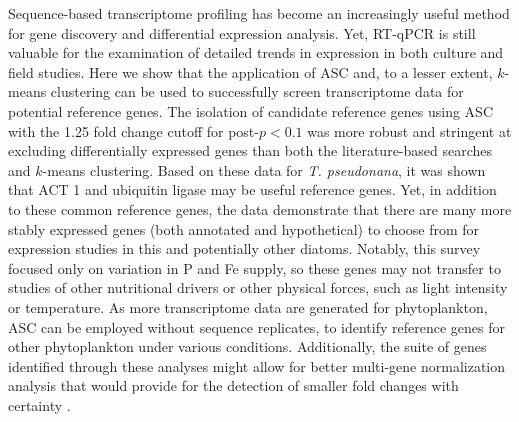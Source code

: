 	Sequence-based transcriptome profiling has become an increasingly useful method for gene discovery and differential expression analysis. Yet, RT-qPCR is still valuable for the examination of detailed trends in expression in both culture and field studies. Here we show that the application of ASC and, to a lesser extent, $k$-means clustering can be used to successfully screen transcriptome data for potential reference genes. The isolation of candidate reference genes using ASC with the 1.25 fold change cutoff for post-$p < 0.1$ was more robust and stringent at excluding differentially expressed genes than both the literature-based searches and $k$-means clustering. Based on these data for \textit{T. pseudonana}, it was shown that ACT 1 and ubiquitin ligase may be useful reference genes. Yet, in addition to these common reference genes, the data demonstrate that there are many more stably expressed genes (both annotated and hypothetical) to choose from for expression studies in this and potentially other diatoms. Notably, this survey focused only on variation in P and Fe supply, so these genes may not transfer to studies of other nutritional drivers or other physical forces, such as light intensity or temperature. As more transcriptome data are generated for phytoplankton, ASC can be employed without sequence replicates, to identify reference genes for other phytoplankton under various conditions. Additionally, the suite of genes identified through these analyses might allow for better multi-gene normalization analysis that would provide for the detection of smaller fold changes with certainty \citep{Vandesompele2002, Czechowski2005}.\par




